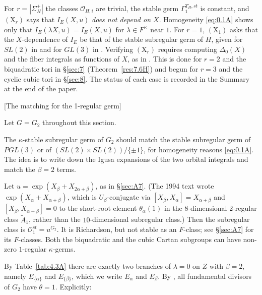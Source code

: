 \documentclass[12pt,letterpaper]{amsart}
\theoremstyle{plain}
\theoremstyle{definition}
\theoremstyle{remark}
\theoremstyle{definition}
\begin{document}
\begin{rem26}
\smallskip
For $r=|\Sigma_H^+|$ the classes $\mathcal O_{H,i}$ are trivial, the stable
germ $\Gamma^{T_H,st}_1$ is constant, and $(\mathrm X_r)$ says that
$I_E(X,u)$ \emph{does not depend on $X$}. Homogeneity \eqref{eq:0.1A} shows
only that $I_E(\lambda X,u)=I_E(X,u)$ for $\lambda\in F^\times$ near $1$.
For $r=1$, $(\mathrm X_1)$ asks that the $X$-dependence of $I_E$ be that of
the stable subregular germ of $H$, given for $SL(2)$ in \cite{SS83} and for
$GL(3)$ in \cite{Re84}. Verifying $(\mathrm X_r)$ requires computing
$\Delta_0(X)$ and the fiber integrals as functions of $X$, as in
\cite[\S6]{Ha89}. This is done for $r=2$ and the biquadratic tori in
\S\ref{sec:7} (Theorem~\ref{res:7.6H}) and begun for $r=3$ and the cyclic cubic
tori in \S\ref{sec:8}. The status of each case is recorded in the Summary at
the end of the paper.
\end{rem26}
[The matching for the 1-regular germ]\label{sec:6}

Let $G=G_2$ throughout this section.

The $\kappa$-stable subregular germ of $G_2$ should match the
stable subregular germ of $PGL(3)$ or of $(SL(2)\times SL(2))/\{\pm 1\}$,
for homogeneity reasons \eqref{eq:0.1A}. The idea is to write down
the Igusa expansions of the two orbital integrals and match the $\beta =2$
terms.

Let $u=\exp(X_\beta+X_{2\alpha+\beta})$, as in \S\ref{sec:A7}. (The 1994 text
wrote $\exp(X_\alpha+X_{\alpha+\beta})$, which is $U_\beta$-conjugate via
$[X_\beta,X_\alpha]=X_{\alpha+\beta}$ and $[X_\beta,X_{\alpha+\beta}]=0$ to the
short-root element $\theta_\alpha(1)$ in the $8$-dimensional $2$-regular class
$\tilde A_1$, rather than the $10$-dimensional subregular class.) Then the
subregular class is ${\mathcal O}_1^{st}=u^{G_2}$. It is Richardson, but not
stable as an $F$-class; see \S\ref{sec:A7} for its $F$-classes.
Both the biquadratic and the cubic Cartan subgroups
can have non-zero $1$-regular $\kappa$-germs.

By Table~\ref{tab:4.3A} there are exactly two branches of $\lambda=0$ on $Z$
with $\beta =2$, namely $E_{\{\alpha\}}$ and $E_{\{\beta\}}$, which we write
$E_\alpha$ and $E_\beta$. By \cite[Ch.~VI, \S2]{Ha92a}, all fundamental
divisors of $G_2$ have $\theta =1$. Explicitly:
\end{document}
